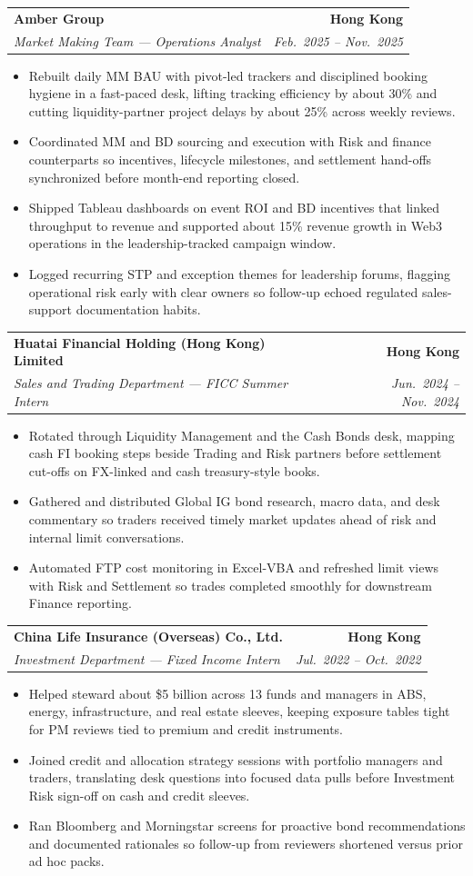 \documentclass[9pt,a4paper]{extarticle}
\makeatletter
\newcommand{\resumeSubheading}[4]{%
  \vspace{0.6em}%
  \begin{tabular*}{\textwidth}{l@{\extracolsep{\fill}}r}
    \textbf{#1} & \textbf{#2} \\
    \textit{\small #3} & \textit{\small #4} \\
  \end{tabular*}\vspace{0.32em}}
\makeatother
\begin{document}
\resumeSubheading{Amber Group}{Hong Kong}{Market Making Team --- Operations Analyst}{Feb.\ 2025 -- Nov.\ 2025}
\begin{itemize}
  \item Rebuilt daily MM BAU with pivot-led trackers and disciplined booking hygiene in a fast-paced desk, lifting tracking efficiency by about 30\% and cutting liquidity-partner project delays by about 25\% across weekly reviews.
  \item Coordinated MM and BD sourcing and execution with Risk and finance counterparts so incentives, lifecycle milestones, and settlement hand-offs synchronized before month-end reporting closed.
  \item Shipped Tableau dashboards on event ROI and BD incentives that linked throughput to revenue and supported about 15\% revenue growth in Web3 operations in the leadership-tracked campaign window.
  \item Logged recurring STP and exception themes for leadership forums, flagging operational risk early with clear owners so follow-up echoed regulated sales-support documentation habits.
\end{itemize}

\resumeSubheading{Huatai Financial Holding (Hong Kong) Limited}{Hong Kong}{Sales and Trading Department --- FICC Summer Intern}{Jun.\ 2024 -- Nov.\ 2024}
\begin{itemize}
  \item Rotated through Liquidity Management and the Cash Bonds desk, mapping cash FI booking steps beside Trading and Risk partners before settlement cut-offs on FX-linked and cash treasury-style books.
  \item Gathered and distributed Global IG bond research, macro data, and desk commentary so traders received timely market updates ahead of risk and internal limit conversations.
  \item Automated FTP cost monitoring in Excel-VBA and refreshed limit views with Risk and Settlement so trades completed smoothly for downstream Finance reporting.
\end{itemize}

\resumeSubheading{China Life Insurance (Overseas) Co., Ltd.}{Hong Kong}{Investment Department --- Fixed Income Intern}{Jul.\ 2022 -- Oct.\ 2022}
\begin{itemize}
  \item Helped steward about \$5 billion across 13 funds and managers in ABS, energy, infrastructure, and real estate sleeves, keeping exposure tables tight for PM reviews tied to premium and credit instruments.
  \item Joined credit and allocation strategy sessions with portfolio managers and traders, translating desk questions into focused data pulls before Investment Risk sign-off on cash and credit sleeves.
  \item Ran Bloomberg and Morningstar screens for proactive bond recommendations and documented rationales so follow-up from reviewers shortened versus prior ad hoc packs.
\end{itemize}
\end{document}

